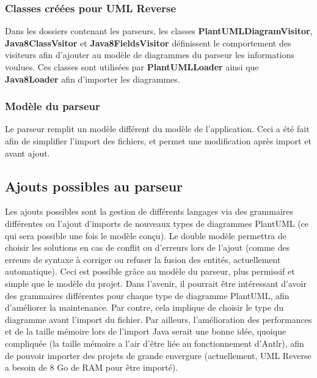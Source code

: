 \documentclass[hidelinks, 10pt,a4paper]{article}
\begin{document}
  \subsubsection{Classes créées pour UML Reverse}
  Dans les dossiers contenant les parseurs, les classes \textbf{PlantUMLDiagramVisitor}, \textbf{Java8ClassVsitor} et \textbf{Java8FieldsVisitor} définissent le comportement des visiteurs afin d'ajouter au modèle de diagrammes du parseur les informations voulues. Ces classes sont utilisées par \textbf{PlantUMLLoader} ainsi que \textbf{Java8Loader} afin d'importer les diagrammes.
  \subsubsection{Modèle du parseur}
  Le parseur remplit un modèle différent du modèle de l'application. Ceci a été fait afin de simplifier l'import des fichiers, et permet une modification après import et avant ajout.
  \subsection{Ajouts possibles au parseur}
  Les ajouts possibles sont la gestion de différents langages via des grammaires différentes ou l'ajout d'imports de nouveaux types de diagrammes PlantUML (ce qui sera possible une fois le modèle conçu).
  Le double modèle permettra de choisir les solutions en cas de conflit ou d'erreurs lors de l'ajout (comme des erreurs de syntaxe à corriger ou refuser la fusion des entités, actuellement automatique). Ceci est possible grâce au modèle du parseur, plus permissif et simple que le modèle du projet.
  Dans l'avenir, il pourrait être intéressant d'avoir des grammaires différentes pour chaque type de diagramme PlantUML, afin d'améliorer la maintenance. Par contre, cela implique de choisir le type du diagramme avant l'import du fichier.
  Par ailleurs, l'amélioration des performances et de la taille mémoire lors de l'import Java serait une bonne idée, quoique compliquée (la taille mémoire a l'air d'être liée au fonctionnement d'Antlr), afin de pouvoir importer des projets de grande envergure (actuellement, UML Reverse a besoin de 8 Go de RAM pour être importé).
  
\end{document}
